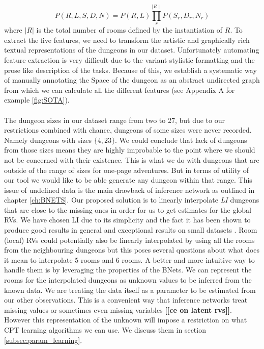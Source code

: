 \documentclass{UoYCSproject}
\begin{document}
\begin{equation}
  \label{eq:full_joint_PD}
  P(R,L,S,D,N) = P(R, L) \prod_{r}^{\mid R \mid} P(S_r, D_r, N_r)
\end{equation}
where \(|R|\) is the total number of rooms defined by the instantiation of \(R\). To extract the five features, we need to transform the artistic and graphically rich textual representations of the dungeons in our dataset. Unfortunately automating feature extraction is very difficult due to the variant stylistic formatting and the prose like description of the tasks. Because of this, we establish a systematic way of manually annotating the Space of the dungeon as an abstract undirected graph from which we can calculate all the different features (see Appendix A for example \ref{fig:SOTA}).

\paragraph{}
The dungeon sizes in our dataset range from two to 27, but due to our restrictions combined with chance, dungeons of some sizes were never recorded. Namely dungeons with sizes \(\{4,23\}\). We could conclude that lack of dungeons from those sizes means they are highly improbable to the point where we should not be concerned with their existence. This is what we do with dungeons that are outside of the range of sizes for one-page adventures. But in terms of utility of our tool we would like to be able generate any dungeon within that range. This issue of undefined data is the main drawback of inference network as outlined in chapter \ref{ch:BNETS}. Our proposed solution is to linearly interpolate \textit{LI} dungeons that are close to the missing ones in order for us to get estimates for the global RVs. We have chosen LI due to its simplicity and the fact it has been shown to produce good results in general \parencite{Ibargengoytia2013OnTE} and exceptional results on small datasets \parencite{yu2004advances}. Room (local) RVs could potentially also be linearly interpolated by using all the rooms from the neighbouring dungeons but this poses several questions about what does it mean to interpolate 5 rooms and 6 rooms. A better and more intuitive way to handle them is by leveraging the properties of the BNets. We can represent the rooms for the interpolated dungeons as unknown values to be inferred from the known data. We are treating the data itself as a parameter to be estimated from our other observations. This is a convenient way that inference networks treat missing values or sometimes even missing variables \textbf{[[ce on latent rvs]]}. However this representation of the unknown will impose a restriction on what CPT learning algorithms we can use. We discuss them in section \ref{subsec:param_learning}.
\end{document}
